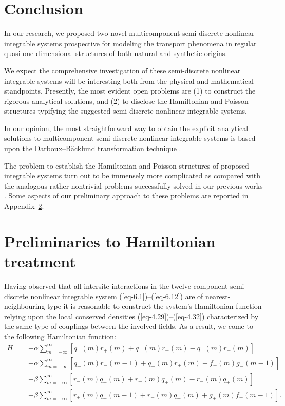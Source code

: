 \documentclass[pdftex]{sigma}
\numberwithin{equation}{section}
\begin{document}
\section{Conclusion}

In our research, we proposed two novel multicomponent semi-discrete nonlinear integrable systems prospective for modeling the transport phenomena in regular quasi-one-dimensional structures of both natural and synthetic origins.

We expect the comprehensive investigation of these semi-discrete nonlinear integrable systems will be interesting both from the physical and mathematical standpoints.
Presently, the most evident open problems are (1) to construct the rigorous analytical solutions, and (2) to disclose the Hamiltonian and Poisson structures typifying the suggested semi-discrete nonlinear integrable systems.

In our opinion, the most straightforward way to obtain the explicit analytical solutions to multicomponent semi-discrete nonlinear integrable systems is based upon the Darboux--B\"{a}cklund transformation technique \cite{vakhnenko-JMP-56-033505,vakhnenko-JNMP-24-250, vakhnenko-JMP-59-053504,vakhnenko-PRE-108-024223, vakhnenko-PRSA-477-20210562, vakhnenko-EPJP-137-1176}.

The problem to establish the Hamiltonian and Poisson structures of proposed integrable systems turn out to be immensely more complicated as compared with the analogous rather nontrivial problems successfully solved in our previous works \cite{vakhnenko-JMP-56-033505, vakhnenko-JMP-57-113504,vakhnenko-JNMP-24-250, vakhnenko-JMP-59-053504, vakhnenko-LMP-108-1807}.
Some aspects of our preliminary approach to these problems are reported in Appendix~\ref{app}.

\appendix

\section{Preliminaries to Hamiltonian treatment}\label{app}

Having observed that all intersite interactions in the twelve-component semi-discrete nonlinear integrable system (\ref{eq-6.1})--(\ref{eq-6.12}) are of nearest-neighbouring
type it is reasonable to construct the system's Hamiltonian function relying upon the local conserved densities (\ref{eq-4.29})--(\ref{eq-4.32}) characterized by the same type
of couplings between the involved fields. As a result, we come to the following Hamiltonian function:
\begin{align}
 H ={}& - \alpha \sum_{m=-\infty}^\infty [q_{-}(m)\bar{r}_{+}(m)+\bar{q}_{-}(m)r_{+}(m)-\bar{q}_{-}(m)\bar{r}_{+}(m)]\nonumber\\
 & - \alpha \sum_{m=-\infty}^\infty [q_{+}(m)r_{-}(m-1)+q_{-}(m)r_{+}(m)+f_{+}(m)g_{-}(m-1)]\nonumber\\
 & - \beta \sum_{m=-\infty}^\infty [r_{-}(m)\bar{q}_{+}(m)+\bar{r}_{-}(m)q_{+}(m)-\bar{r}_{-}(m)\bar{q}_{+}(m)]\nonumber\\
 & - \beta \sum_{m=-\infty}^\infty [r_{+}(m)q_{-}(m-1)+r_{-}(m)q_{+}(m)+g_{+}(m)f_{-}(m-1)] .\label{eq-A.1}
\end{align}
\end{document}
